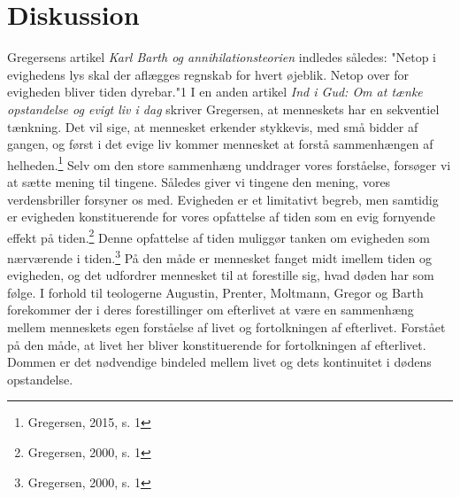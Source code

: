 \chapter{Diskussion}
\label{chp:disk}
Gregersens artikel \textit{Karl Barth og annihilationsteorien} indledes således: "Netop i evighedens lys skal der aflægges regnskab for hvert øjeblik. Netop over for evigheden bliver tiden dyrebar."1 I en anden artikel \textit{Ind i Gud: Om at tænke opstandelse og evigt liv i dag} skriver Gregersen, at menneskets har en sekventiel tænkning. Det vil sige, at mennesket erkender stykkevis, med små bidder af gangen, og først i det evige liv kommer mennesket at forstå sammenhængen af helheden.\footnote{Gregersen, 2015, s. 1} Selv om den store sammenhæng unddrager vores forståelse, forsøger vi at sætte mening til tingene. Således giver vi tingene den mening, vores verdensbriller forsyner os med. Evigheden er et limitativt begreb, men samtidig er evigheden konstituerende for vores opfattelse af tiden som en evig fornyende effekt på tiden.\footnote{Gregersen, 2000, s. 1} Denne opfattelse af tiden muliggør tanken om evigheden som nærværende i tiden.\footnote{Gregersen, 2000, s. 1} På den måde er mennesket fanget midt imellem tiden og evigheden, og det udfordrer mennesket til at forestille sig, hvad døden har som følge. I forhold til teologerne Augustin, Prenter, Moltmann, Gregor og Barth forekommer der i deres forestillinger om efterlivet at være en sammenhæng mellem menneskets egen forståelse af livet og fortolkningen af efterlivet. Forstået på den måde, at livet her bliver konstituerende for fortolkningen af efterlivet. Dommen er det nødvendige bindeled mellem livet og dets kontinuitet i dødens opstandelse.

